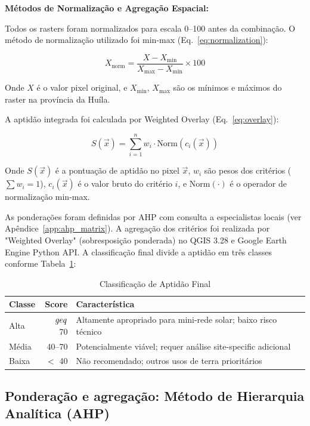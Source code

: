 \documentclass[12pt, a4paper]{article}
\begin{document}
\noindent \textbf{Métodos de Normalização e Agregação Espacial:}

Todos os rasters foram normalizados para escala 0–100 antes da combinação. O método de normalização utilizado foi min-max (Eq.~\ref{eq:normalization}):

\begin{equation}
\label{eq:normalization}
X_{\text{norm}} = \frac{X - X_{\min}}{X_{\max} - X_{\min}} \times 100
\end{equation}

Onde $X$ é o valor pixel original, e $X_{\min}$, $X_{\max}$ são os mínimos e máximos do raster na província da Huíla.

A aptidão integrada foi calculada por Weighted Overlay (Eq.~\ref{eq:overlay}):

\begin{equation}
\label{eq:overlay}
S(\vec{x}) = \sum_{i=1}^{n} w_i \cdot \text{Norm}(c_{i}(\vec{x}))
\end{equation}

Onde $S(\vec{x})$ é a pontuação de aptidão no pixel $\vec{x}$, $w_i$ são pesos dos critérios ($\sum w_i = 1$), $c_i(\vec{x})$ é o valor bruto do critério $i$, e $\text{Norm}(\cdot)$ é o operador de normalização min-max.

As ponderações foram definidas por AHP com consulta a especialistas locais (ver Apêndice~\ref{app:ahp_matrix}). A agregação dos critérios foi realizada por "Weighted Overlay" (sobresposição ponderada) no QGIS 3.28 e Google Earth Engine Python API. A classificação final divide a aptidão em três classes conforme Tabela~\ref{tab:aptitude_classes}:

\begin{table}[H]
\centering
\caption{Classificação de Aptidão Final}
\label{tab:aptitude_classes}
\begin{tabular}{|l|r|l|}
\hline
\textbf{Classe} & \textbf{Score} & \textbf{Característica} \\
\hline
Alta & $\\geq$ 70 & Altamente apropriado para mini-rede solar; baixo risco técnico \\
Média & 40–70 & Potencialmente viável; requer análise site-specific adicional \\
Baixa & $<$ 40 & Não recomendado; outros usos de terra prioritários \\
\hline
\end{tabular}
\end{table}

\subsection{Ponderação e agregação: Método de Hierarquia Analítica (AHP)}
\end{document}
